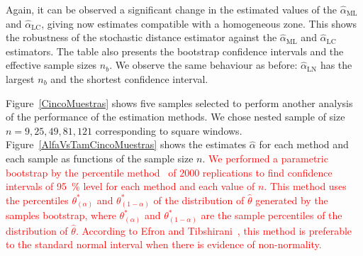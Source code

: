 \documentclass[twocolumn]{svjour3}
\begin{document}
Again, it can be observed a significant change in the estimated values of the $\widehat{\alpha}_{\text{{ML}}}$ and $\widehat{\alpha}_{\text{{LC}}}$, giving now estimates compatible with a homogeneous zone. This shows the robustness of the stochastic distance estimator against the $\widehat{\alpha}_{\text{{ML}}}$ and $\widehat{\alpha}_{\text{{LC}}}$ estimators.
The table also presents the bootstrap confidence intervals and the effective sample sizes $n_b$. 
We observe the same behaviour as before: $\widehat{\alpha}_{\text{{LN}}}$ has the largest $n_b$ and the shortest confidence interval.


Figure~\ref{CincoMuestras} shows five samples selected to perform another analysis of the performance of the estimation methods. 
We chose nested sample of size $n=9,25,49,81,121$ corresponding to square windows. 
Figure~\ref{AlfaVsTamCincoMuestras} shows the estimates $\widehat{\alpha}$ for each method and each sample as functions of the sample size $n$. 
\textcolor{red}{We performed a parametric bootstrap by the percentile method~\cite{Davison1997} of $2000$ replications to find confidence intervals of \SI{95}{\percent} level for each method and each value of $n$.     
This method uses the percentiles $\theta^*_{(\alpha)}$ and $\theta^*_{(1-\alpha)}$ of the distribution of $\widehat{\theta} $ generated by the samples bootstrap, where $\theta^*_{(\alpha)}$ and $\theta^*_{(1-\alpha)}$ are the sample percentiles of the distribution of $\widehat{\theta} $. 
According to Efron and Tibshirani~\cite{Efron93}, this method is preferable to the standard normal interval when there is evidence of non-normality. }
\end{document}
